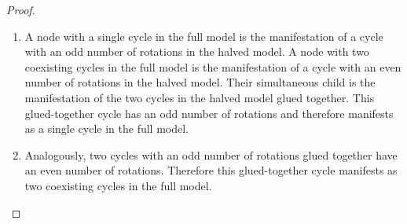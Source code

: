 \begin{proof}
	\begin{enumerate}
		\item A node with a single cycle in the full model is the manifestation of a cycle with an odd number of rotations in the halved model.
		      A node with two coexisting cycles in the full model is the manifestation of a cycle with an even number of rotations in the halved model.
		      Their simultaneous child is the manifestation of the two cycles in the halved model glued together.
		      This glued-together cycle has an odd number of rotations and therefore manifests as a single cycle in the full model.
		\item Analogously, two cycles with an odd number of rotations glued together have an even number of rotations.
		      Therefore this glued-together cycle manifests as two coexisting cycles in the full model.
	\end{enumerate}
\end{proof}

